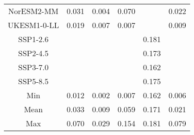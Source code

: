 \begin{table*}[t]
\begin{tabular}{c|rrr|rr}
NorESM2-MM & 0.031 & 0.004 & 0.070 &  & 0.022 \\
UKESM1-0-LL & 0.019 & 0.007 & 0.007 &  & 0.009 \\
SSP1-2.6 &  &  &  & 0.181 &  \\
SSP2-4.5 &  &  &  & 0.173 &  \\
SSP3-7.0 &  &  &  & 0.162 &  \\
SSP5-8.5 &  &  &  & 0.175 &  \\
\midrule
Min & 0.012 & 0.002 & 0.007 & 0.162 & 0.006 \\
Mean & 0.033 & 0.009 & 0.059 & 0.171 & 0.021 \\
Max & 0.070 & 0.029 & 0.154 & 0.181 & 0.079 \\
\bottomrule
\end{tabular}
\end{table*}
